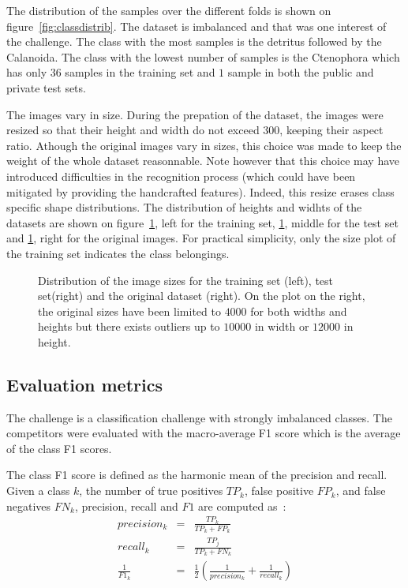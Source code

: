 \documentclass{article}
\begin{document}
The distribution of the samples over the different folds is shown on figure~\ref{fig:classdistrib}. The dataset is imbalanced and that was one interest of the challenge. The class with the most samples is the detritus followed by the Calanoida. The class with the lowest number of samples is the Ctenophora which has only $36$ samples in the training set and $1$ sample in both the public and private test sets.

The images vary in size. During the prepation of the dataset, the images were resized so that their height and width do not exceed $300$, keeping their aspect ratio. Athough the original images vary in sizes, this choice was made to keep the weight of the whole dataset reasonnable. Note however that this choice may have introduced difficulties in the recognition process (which could have been mitigated by providing the handcrafted features). Indeed, this resize erases class specific shape distributions. The distribution of heights and widhts of the datasets are shown on figure~\ref{fig:sizes}, left for the training set, \ref{fig:sizes}, middle for the test set and \ref{fig:sizes}, right for the original images. For practical simplicity, only the size plot of the training set indicates the class belongings.


\begin{figure}
	\begin{center}
	\end{center}
	\caption{\label{fig:sizes} Distribution of the image sizes for the training set (left), test set(right) and the original dataset (right). On the plot on the right, the original sizes have been limited to $4000$ for both widths and heights but there exists outliers up to $10000$ in width or $12000$ in height.}
\end{figure}


\subsection{Evaluation metrics}

The challenge is a classification challenge with strongly imbalanced classes. The competitors were evaluated with the macro-average F1 score which is the average of the class F1 scores.

The class F1 score is defined as the harmonic mean of the precision and recall. Given a class $k$, the number of true positives $TP_k$, false positive $FP_k$, and false negatives $FN_k$, precision, recall and $F1$ are computed as~:
\begin{eqnarray*}
	precision_k &=& \frac{TP_k}{TP_k + FP_k}\\
	recall_k &=& \frac{TP_j}{TP_k + FN_k}\\
	\frac{1}{F1_k} &=& \frac{1}{2}(\frac{1}{precision_k} + \frac{1}{recall_k})
\end{eqnarray*}
\end{document}
